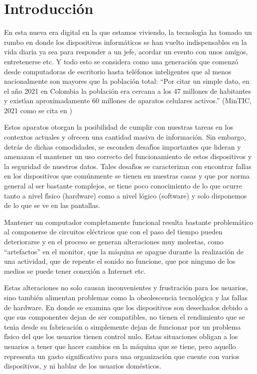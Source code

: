 \pagebreak
\section{Introducci\'on}

En esta nueva era digital en la que estamos viviendo, la tecnolog\'{\i}a ha tomado un
rumbo en donde los dispositivos inform\'aticos se han vuelto
indispensables en la vida diaria ya sea para responder a un jefe, acordar un
evento con unos amigos, entretenerse etc. Y todo esto se considera como una
generaci\'on que comenz\'o desde computadoras de escritorio hasta tel\'efonos
inteligentes que al menos nacionalmente son mayores que la poblaci\'on total:
``Por citar un simple dato, en el a\~no 2021 en Colombia la poblaci\'on era cercana
a los 47 millones de habitantes y exist\'{\i}an aproximadamente 60 millones de
aparatos celulares activos.'' (MinTIC, 2021  como se cita en \cite{Trejos2023})

Estos aparatos otorgan la posibilidad de cumplir con nuestras tareas en los
contextos actuales y ofrecen una cantidad masiva de informaci\'on. Sin embargo,
detr\'as de dichas comodidades, se esconden desaf\'{\i}os importantes que lideran y
amenazan el mantener un uso correcto del funcionamiento de estos dispositivos y
la seguridad de nuestros datos. Tales desaf\'{\i}os se caracterizan con encontrar
fallas en los dispositivos que com\'unmente se tienen en nuestras casas y que por
norma general al ser bastante complejos, se tiene poco conocimiento de lo que
ocurre tanto a nivel f\'{\i}sico (hardware) como a nivel l\'ogico (software) y solo
disponemos de lo que se ve en las pantallas.

Mantener un computador completamente funcional resulta bastante problem\'atico al
componerse de circuitos el\'ectricos que con el paso del tiempo pueden
deteriorarse y en el proceso se generan alteraciones muy molestas, como
``artefactos'' en el monitor, que la m\'aquina se apague durante la realizaci\'on de
una actividad, que de repente el sonido no funcione, que por ninguno de los
medios se puede tener conexi\'on a Internet etc.

Estas alteraciones no solo causan inconvenientes y frustraci\'on para los
usuarios, sino tambi\'en alimentan problemas como la obsolescencia tecnol\'ogica y
las fallas de hardware. En donde se examina que los dispositivos son desechados
debido a que sus componentes dejan de ser compatibles, no tienen el rendimiento
que se ten\'{\i}a desde su fabricaci\'on o simplemente dejan de funcionar por un
problema f\'{\i}sico del que los usuarios tienen control nulo. Estas situaciones
obligan a los usuarios a tener que hacer cambios en la m\'aquina que se tiene,
pero aquello representa un gasto significativo para una organizaci\'on que cuente
con varios dispositivos, y ni hablar de los usuarios dom\'esticos.

